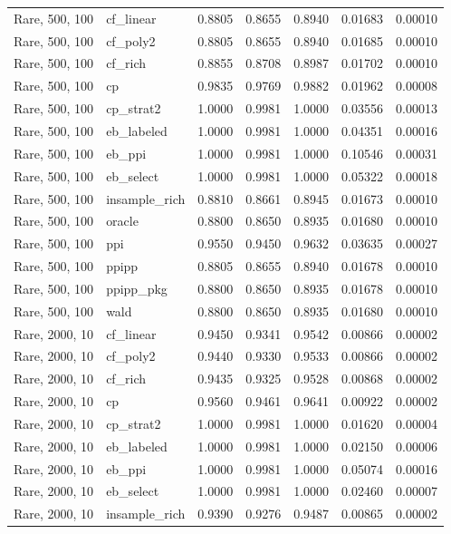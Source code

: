 \begin{longtable}{llrrrrr}
Rare, 500, 100 & cf\_linear & 0.8805 & 0.8655 & 0.8940 & 0.01683 & 0.00010 \\
Rare, 500, 100 & cf\_poly2 & 0.8805 & 0.8655 & 0.8940 & 0.01685 & 0.00010 \\
Rare, 500, 100 & cf\_rich & 0.8855 & 0.8708 & 0.8987 & 0.01702 & 0.00010 \\
Rare, 500, 100 & cp & 0.9835 & 0.9769 & 0.9882 & 0.01962 & 0.00008 \\
Rare, 500, 100 & cp\_strat2 & 1.0000 & 0.9981 & 1.0000 & 0.03556 & 0.00013 \\
Rare, 500, 100 & eb\_labeled & 1.0000 & 0.9981 & 1.0000 & 0.04351 & 0.00016 \\
Rare, 500, 100 & eb\_ppi & 1.0000 & 0.9981 & 1.0000 & 0.10546 & 0.00031 \\
Rare, 500, 100 & eb\_select & 1.0000 & 0.9981 & 1.0000 & 0.05322 & 0.00018 \\
Rare, 500, 100 & insample\_rich & 0.8810 & 0.8661 & 0.8945 & 0.01673 & 0.00010 \\
Rare, 500, 100 & oracle & 0.8800 & 0.8650 & 0.8935 & 0.01680 & 0.00010 \\
Rare, 500, 100 & ppi & 0.9550 & 0.9450 & 0.9632 & 0.03635 & 0.00027 \\
Rare, 500, 100 & ppipp & 0.8805 & 0.8655 & 0.8940 & 0.01678 & 0.00010 \\
Rare, 500, 100 & ppipp\_pkg & 0.8800 & 0.8650 & 0.8935 & 0.01678 & 0.00010 \\
Rare, 500, 100 & wald & 0.8800 & 0.8650 & 0.8935 & 0.01680 & 0.00010 \\
Rare, 2000, 10 & cf\_linear & 0.9450 & 0.9341 & 0.9542 & 0.00866 & 0.00002 \\
Rare, 2000, 10 & cf\_poly2 & 0.9440 & 0.9330 & 0.9533 & 0.00866 & 0.00002 \\
Rare, 2000, 10 & cf\_rich & 0.9435 & 0.9325 & 0.9528 & 0.00868 & 0.00002 \\
Rare, 2000, 10 & cp & 0.9560 & 0.9461 & 0.9641 & 0.00922 & 0.00002 \\
Rare, 2000, 10 & cp\_strat2 & 1.0000 & 0.9981 & 1.0000 & 0.01620 & 0.00004 \\
Rare, 2000, 10 & eb\_labeled & 1.0000 & 0.9981 & 1.0000 & 0.02150 & 0.00006 \\
Rare, 2000, 10 & eb\_ppi & 1.0000 & 0.9981 & 1.0000 & 0.05074 & 0.00016 \\
Rare, 2000, 10 & eb\_select & 1.0000 & 0.9981 & 1.0000 & 0.02460 & 0.00007 \\
Rare, 2000, 10 & insample\_rich & 0.9390 & 0.9276 & 0.9487 & 0.00865 & 0.00002 \\

\end{longtable}
